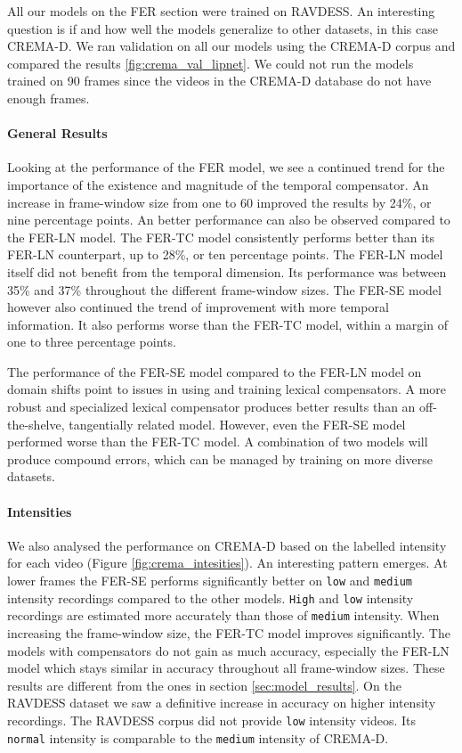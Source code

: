 All our models on the FER section were trained on RAVDESS. An interesting question is if and how well the models generalize to other datasets, in this case CREMA-D. We ran validation on all our models using the CREMA-D corpus and compared the results \ref{fig:crema_val_lipnet}. We could not run the models trained on 90 frames since the videos in the CREMA-D database do not have enough frames.

\paragraph{General Results}
Looking at the performance of the FER model, we see a continued trend for the importance of the existence and magnitude of the temporal compensator. An increase in frame-window size from one to 60 improved the results by 24\%, or nine percentage points. An better performance can also be observed compared to the FER-LN model. The FER-TC model consistently performs better than its FER-LN counterpart, up to 28\%, or ten percentage points. The FER-LN model itself did not benefit from the temporal dimension. Its performance was between 35\% and 37\% throughout the different frame-window sizes. The FER-SE model however also continued the trend of improvement with more temporal information. It also performs worse than the FER-TC model, within a margin of one to three percentage points. 

The performance of the FER-SE model compared to the FER-LN model on domain shifts point to issues in using and training lexical compensators. A more robust and specialized lexical compensator produces better results than an off-the-shelve, tangentially related model. However, even the FER-SE model performed worse than the FER-TC model. A combination of two models will produce compound errors, which can be managed by training on more diverse datasets.

\paragraph{Intensities}
We also analysed the performance on CREMA-D based on the labelled intensity for each video (Figure \ref{fig:crema_intesities}). An interesting pattern emerges. At lower frames the FER-SE performs significantly better on \texttt{low} and \texttt{medium} intensity recordings compared to the other models. \texttt{High} and \texttt{low} intensity recordings are estimated more accurately than those of \texttt{medium} intensity. When increasing the frame-window size, the FER-TC model improves significantly. The models with compensators do not gain as much accuracy, especially the FER-LN model which stays similar in accuracy throughout all frame-window sizes. These results are different from the ones in section \ref{sec:model_results}. On the RAVDESS dataset we saw a definitive increase in accuracy on higher intensity recordings. The RAVDESS corpus did not provide \texttt{low} intensity videos. Its \texttt{normal} intensity is comparable to the \texttt{medium} intensity of CREMA-D.


